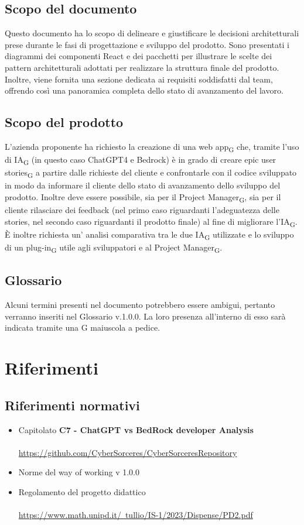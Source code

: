 \documentclass{article}
\begin{document}
{\subsection{Scopo del documento}
Questo documento ha lo scopo di delineare e giustificare le decisioni architetturali prese durante le fasi di progettazione e sviluppo del prodotto. Sono presentati i diagrammi dei componenti React e dei pacchetti per illustrare le scelte dei pattern architetturali adottati per realizzare la struttura finale del prodotto. Inoltre, viene fornita una sezione dedicata ai requisiti soddisfatti dal team, offrendo così una panoramica completa dello stato di avanzamento del lavoro.
\subsection{Scopo del prodotto}
L'azienda proponente ha richiesto la creazione di una web app\textsubscript{G} che, tramite l'uso di IA\textsubscript{G} (in questo caso ChatGPT4 e Bedrock) è in grado di creare epic user stories\textsubscript{G} a partire dalle richieste del cliente e confrontarle con il codice sviluppato in modo da informare il cliente dello stato di avanzamento dello sviluppo del prodotto. Inoltre deve essere possibile, sia per il Project Manager\textsubscript{G}, sia per il cliente rilasciare dei feedback (nel primo caso riguardanti l'adeguatezza delle stories, nel secondo caso riguardanti il prodotto finale) al fine di migliorare l'IA\textsubscript{G}. È inoltre richiesta un' analisi comparativa tra le due IA\textsubscript{G} utilizzate e lo sviluppo di un plug-in\textsubscript{G} utile agli sviluppatori e al Project Manager\textsubscript{G}.

\subsection{Glossario}
Alcuni termini presenti nel documento potrebbero essere ambigui, pertanto verranno inseriti nel Glossario v.1.0.0. La loro presenza all'interno di esso sarà indicata tramite una G maiuscola a pedice.

\section{Riferimenti}
\subsection{Riferimenti normativi}
\begin{itemize}
    \item Capitolato \textbf{C7 - ChatGPT vs BedRock developer Analysis}
    \\ \\
       \href{https://github.com/CyberSorceres/CyberSorceresRepository}{https://github.com/CyberSorceres/CyberSorceresRepository} 
    \item Norme del way of working v 1.0.0
    \item Regolamento del progetto didattico \\ \\ \href{https://www.math.unipd.it/~tullio/IS-1/2023/Dispense/PD2.pdf} 
    {https://www.math.unipd.it/~tullio/IS-1/2023/Dispense/PD2.pdf}
\end{itemize}
}
\end{document}
